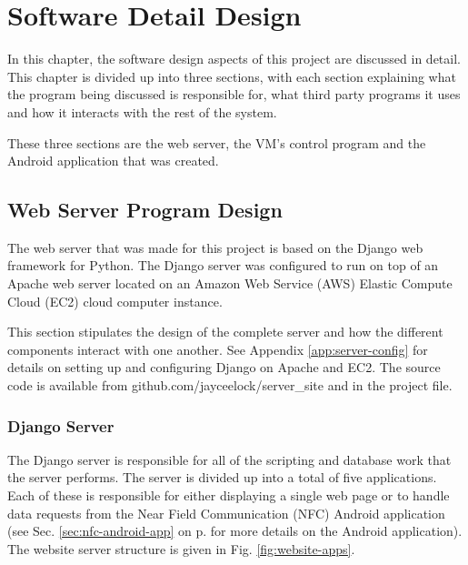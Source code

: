 \chapter{Software Detail Design}
\label{chap:4}

In this chapter, the software design aspects of this project are discussed in
detail. This chapter is divided up into three sections, with each section
explaining what the program being discussed is responsible for, what third party programs it
uses and how it interacts with the rest of the system. 

These three sections are the web server, the VM's control program and the
Android application that was created.

\section{Web Server Program Design}

The web server that was made for this project is based on the Django web
framework for Python. The Django server was configured to run on top of
an Apache web server located on an Amazon Web Service (AWS) Elastic Compute
Cloud (EC2) cloud computer instance.

This section stipulates the design of the complete server and how the different
components interact with one another. See Appendix \ref{app:server-config} for details on
setting up and configuring Django on Apache and EC2. The source code is
available from github.com/jayceelock/server\_site and in the project file. 

\subsection{Django Server}

The Django server is responsible for all of the scripting and database work
that the server performs. The server is divided up into a total of five
applications. Each of these is responsible for either displaying a single web
page or to handle data requests from the Near Field Communication (NFC) Android
application (see Sec. \ref{sec:nfc-android-app} on p.\pageref{sec:nfc-android-app}
for more details on the Android application). The website server structure is given
in Fig. \ref{fig:website-apps}.

